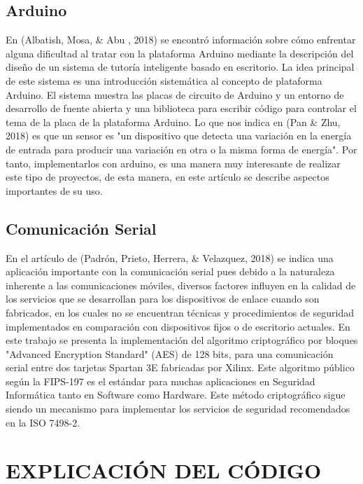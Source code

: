 \documentclass[letterpaper, 10 pt, conference]{ieeeconf}
\begin{document}
\subsection{Arduino}
En (Albatish, Mosa, & Abu , 2018) se encontró información sobre cómo enfrentar alguna dificultad al tratar con la plataforma Arduino mediante la descripción del diseño de un sistema de tutoría inteligente basado en escritorio. La idea principal de este sistema es una introducción sistemática al concepto de plataforma Arduino. El sistema muestra las placas de circuito de Arduino y un entorno de desarrollo de fuente abierta y una biblioteca para escribir código para controlar el tema de la placa de la plataforma Arduino.
Lo que nos indica en (Pan & Zhu, 2018) es que un sensor es "un dispositivo que detecta una variación en la energía de entrada para producir una variación en otra o la misma forma de energía". Por tanto, implementarlos con arduino, es una manera muy interesante de realizar este tipo de proyectos, de esta manera, en este artículo se describe aspectos importantes de su uso.\\

\subsection{Comunicación Serial}
En el artículo de (Padrón, Prieto, Herrera, & Velazquez, 2018) se indica una aplicación importante con la comunicación serial pues debido a la naturaleza inherente a las comunicaciones móviles, diversos factores influyen en la calidad de los servicios que se desarrollan para los dispositivos de enlace cuando son fabricados, en los cuales no se encuentran técnicas y procedimientos de seguridad implementados en comparación con dispositivos fijos o de escritorio actuales. En este trabajo se presenta la implementación del algoritmo criptográfico por bloques "Advanced Encryption Standard" (AES) de 128 bits, para una comunicación serial entre dos tarjetas Spartan 3E fabricadas por Xilinx. Este algoritmo público según la FIPS-197 es el estándar para muchas aplicaciones en Seguridad Informática tanto en Software como Hardware. Este método criptográfico sigue siendo un mecanismo para implementar los servicios de seguridad recomendados en la ISO 7498-2.

\section{EXPLICACIÓN DEL CÓDIGO}
\end{document}
